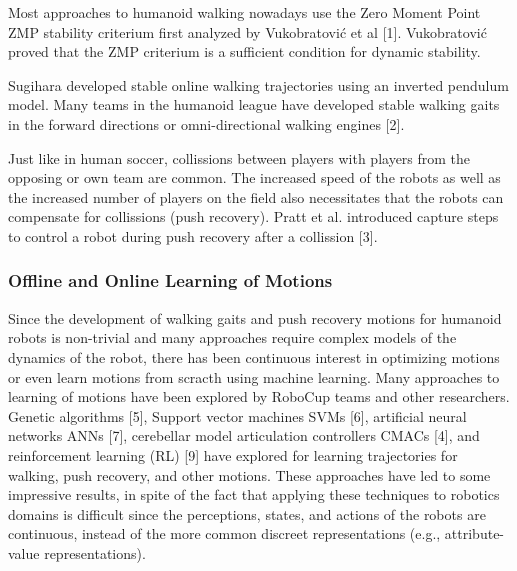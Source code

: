 \documentclass{article}
\begin{document}
Most approaches to humanoid walking nowadays use the Zero Moment Point ZMP stability criterium first analyzed by Vukobratović et al [1].
Vukobratović proved that the ZMP criterium is a sufficient condition for dynamic stability.

Sugihara developed stable online walking trajectories using an inverted pendulum model.
Many teams in the humanoid league have developed stable walking gaits in the forward directions or omni-directional walking engines [2].

Just like in human soccer, collissions between players with players from the opposing or own team are common.
The increased speed of the robots as well as the increased number of players on the field also necessitates that the robots can compensate for collissions (push recovery).
Pratt et al. introduced capture steps to control a robot during push recovery after a collission [3].

% 

\subsubsection{Offline and Online Learning of Motions}

Since the development of walking gaits and push recovery motions for humanoid robots is non-trivial and many approaches require complex models of the dynamics of the robot, there has been continuous interest in optimizing motions or even learn motions from scracth using machine learning.
Many approaches to learning of motions have been explored by RoboCup teams and other researchers.
Genetic algorithms [5], Support vector machines SVMs [6], artificial neural networks ANNs [7], cerebellar model articulation controllers CMACs [4], and reinforcement learning (RL) [9] have explored for learning trajectories for walking, push recovery, and other motions. 
These approaches have led to some impressive results, in spite of the fact that applying these techniques to robotics domains is difficult since the perceptions, states, and actions of the robots are continuous, instead of the more common discreet representations (e.g., attribute-value representations).
\end{document}
